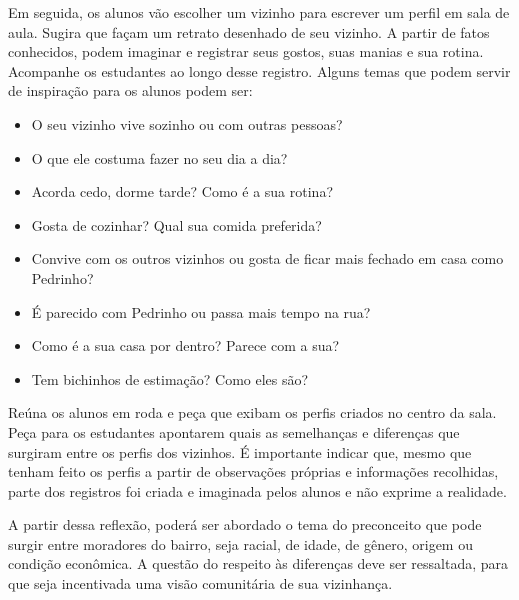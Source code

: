 \documentclass[11pt]{extarticle}
\begin{document}

Em seguida, os alunos vão escolher um vizinho para escrever um perfil em sala de aula. Sugira que façam um retrato desenhado de seu vizinho. A partir de fatos conhecidos, podem imaginar e registrar seus gostos, suas manias e sua rotina. Acompanhe os estudantes ao longo desse registro. Alguns temas que podem servir de inspiração para os alunos podem ser:

\begin{itemize} 

\item O seu vizinho vive sozinho ou com outras pessoas?

\item O que ele costuma fazer no seu dia a dia?

\item Acorda cedo, dorme tarde? Como é a sua rotina?

\item Gosta de cozinhar? Qual sua comida preferida?

\item Convive com os outros vizinhos ou gosta de ficar mais fechado em casa como Pedrinho?

\item É parecido com Pedrinho ou passa mais tempo na rua?

\item Como é a sua casa por dentro? Parece com a sua?

\item Tem bichinhos de estimação? Como eles são?

\end{itemize}

Reúna os alunos em roda e peça que exibam os perfis criados no centro da sala. Peça para os estudantes apontarem quais as semelhanças e diferenças que surgiram entre os perfis dos vizinhos. É importante indicar que, mesmo que tenham feito os perfis a partir de observações próprias e informações recolhidas, parte dos registros foi criada e imaginada pelos alunos e não exprime a realidade.

A partir dessa reflexão, poderá ser abordado o tema do preconceito que pode surgir entre moradores do bairro, seja racial, de idade, de gênero, origem ou condição econômica. A questão do respeito às diferenças deve ser ressaltada, para que seja incentivada uma visão comunitária de sua vizinhança.
\end{document}
